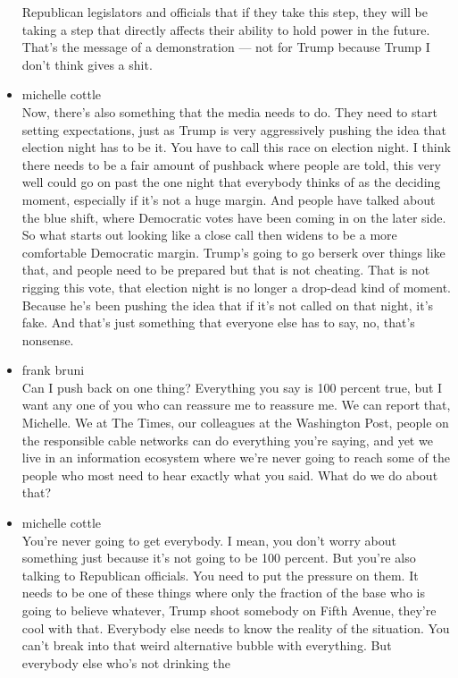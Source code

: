 \begin{itemize}
  Republican legislators and officials that if they take this step, they
  will be taking a step that directly affects their ability to hold
  power in the future. That's the message of a demonstration --- not for
  Trump because Trump I don't think gives a shit.
\item
  michelle cottle\\
  Now, there's also something that the media needs to do. They need to
  start setting expectations, just as Trump is very aggressively pushing
  the idea that election night has to be it. You have to call this race
  on election night. I think there needs to be a fair amount of pushback
  where people are told, this very well could go on past the one night
  that everybody thinks of as the deciding moment, especially if it's
  not a huge margin. And people have talked about the blue shift, where
  Democratic votes have been coming in on the later side. So what starts
  out looking like a close call then widens to be a more comfortable
  Democratic margin. Trump's going to go berserk over things like that,
  and people need to be prepared but that is not cheating. That is not
  rigging this vote, that election night is no longer a drop-dead kind
  of moment. Because he's been pushing the idea that if it's not called
  on that night, it's fake. And that's just something that everyone else
  has to say, no, that's nonsense.
\item
  frank bruni\\
  Can I push back on one thing? Everything you say is 100 percent true,
  but I want any one of you who can reassure me to reassure me. We can
  report that, Michelle. We at The Times, our colleagues at the
  Washington Post, people on the responsible cable networks can do
  everything you're saying, and yet we live in an information ecosystem
  where we're never going to reach some of the people who most need to
  hear exactly what you said. What do we do about that?
\item
  michelle cottle\\
  You're never going to get everybody. I mean, you don't worry about
  something just because it's not going to be 100 percent. But you're
  also talking to Republican officials. You need to put the pressure on
  them. It needs to be one of these things where only the fraction of
  the base who is going to believe whatever, Trump shoot somebody on
  Fifth Avenue, they're cool with that. Everybody else needs to know the
  reality of the situation. You can't break into that weird alternative
  bubble with everything. But everybody else who's not drinking the

\end{itemize}

